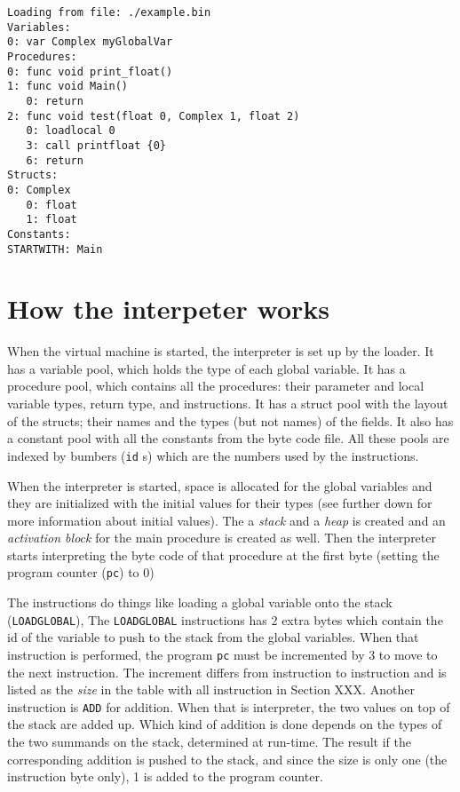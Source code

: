\documentclass[11pt]{article}
\begin{document}
\begin{verbatim}
Loading from file: ./example.bin
Variables:
0: var Complex myGlobalVar
Procedures:
0: func void print_float()
1: func void Main()
   0: return
2: func void test(float 0, Complex 1, float 2)
   0: loadlocal 0
   3: call printfloat {0}
   6: return
Structs:
0: Complex
   0: float
   1: float
Constants:
STARTWITH: Main
\end{verbatim}
\section{How the interpeter works}
\label{sec:org72e99db}

When the virtual machine is started, the interpreter is set up by the
loader. It has a variable pool, which holds the type of each global
variable. It has a procedure pool, which contains all the procedures: their
parameter and local variable types, return type, and instructions. It has a
struct pool with the layout of the structs; their names and the types (but
not names) of the fields. It also has a constant pool with all the
constants from the byte code file. All these pools are indexed by bumbers
(\texttt{id} s) which are the numbers used by the instructions.

When the interpreter is started, space is allocated for the global
variables and they are initialized with the initial values for their types
(see further down for more information about initial values). The a \emph{stack}
and a \emph{heap} is created and an \emph{activation block} for the main procedure is
created as well. Then the interpreter starts interpreting the byte code of
that procedure at the first byte (setting the program counter (\texttt{pc}) to
\(0\))


The instructions do things like loading a global variable onto the stack
(\texttt{LOADGLOBAL}), The \texttt{LOADGLOBAL} instructions has 2 extra bytes which
contain the id of the variable to push to the stack from the global
variables. When that instruction is performed, the program \texttt{pc} must be
incremented by 3 to move to the next instruction. The increment differs
from instruction to instruction and is listed as the \emph{size} in the table
with all instruction in Section XXX. Another instruction is \texttt{ADD} for
addition. When that is interpreter, the two values on top of the stack are
added up. Which kind of addition is done depends on the types of the two
summands on the stack, determined at run-time. The result if the
corresponding addition is pushed to the stack, and since the size is only
one (the instruction byte only), 1 is added to the program counter.
\end{document}
